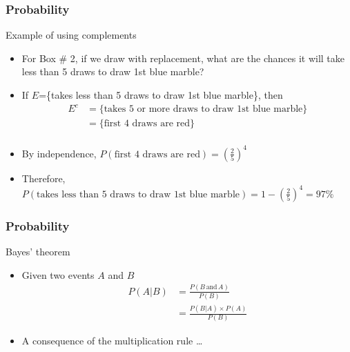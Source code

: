 \documentclass[handout]{beamer}
\begin{document}
   \begin{frame} \frametitle{Probability}

   \begin{block}
   {Example of using complements}
   \begin{itemize}
   \item For Box \# 2, if we draw with replacement, what are
   the chances it will take less than 5 draws to draw 1st blue marble?
   \item If $E$=\{takes less than 5 draws to draw 1st blue marble\},
   then
   $$
   \begin{aligned}
   E^c &=\{\text{takes 5 or more draws to draw 1st blue marble}\} \\
   &=\{\text{first 4 draws are red}\} \\
   \end{aligned}
   $$
   \item By independence, $
   P(\text{first 4 draws are red}) = \left(\frac{2}{5}\right)^4
   $
   \item Therefore, $P(\text{takes less than 5 draws to draw 1st blue marble}) = 1 -  \left(\frac{2}{5}\right)^4 = 97\%$
   \end{itemize}
   \end{block}
   \end{frame}


   \begin{frame} \frametitle{Probability}

   \begin{block}
   {Bayes' theorem}
   \begin{itemize}
   \item Given two events $A$ and $B$
   $$
   \begin{aligned}
   P(A|B) &= \frac{P(B \, \text{and} \,  A)}{P(B)} \\
   &= \frac{P(B|A)\times P(A)}{P(B)}
   \end{aligned}
   $$
   \item A consequence of the multiplication rule \dots

   \end{itemize}
   \end{block}
   \end{frame}

\end{document}
